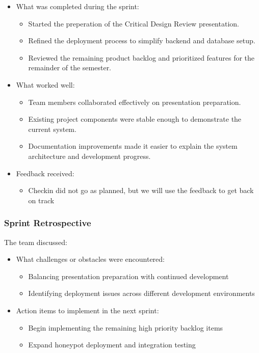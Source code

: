 \documentclass{article}
\begin{document}
\begin{itemize}
    \item What was completed during the sprint:
    \begin{itemize}
        \item Started the preperation of the Critical Design Review presentation.
        \item Refined the deployment process to simplify backend and database setup.
        \item Reviewed the remaining product backlog and prioritized features for the remainder of the semester.
    \end{itemize}

    \item What worked well:
    \begin{itemize}
        \item Team members collaborated effectively on presentation preparation.
        \item Existing project components were stable enough to demonstrate the current system.
        \item Documentation improvements made it easier to explain the system architecture and development progress.
    \end{itemize}
    \item Feedback received:
    \begin{itemize}
        \item Checkin did not go as planned, but we will use the feedback to get back on track 
    \end{itemize}
\end{itemize}

\subsubsection{Sprint Retrospective}
The team discussed:

\begin{itemize}
    \item What challenges or obstacles were encountered:
    \begin{itemize}
            \item Balancing presentation preparation with continued development
            \item Identifying deployment issues across different development environments
        \end{itemize}

    \item Action items to implement in the next sprint:
    \begin{itemize}
        \item Begin implementing the remaining high priority backlog items
        \item Expand honeypot deployment and integration testing
    \end{itemize}
\end{itemize}
\end{document}
